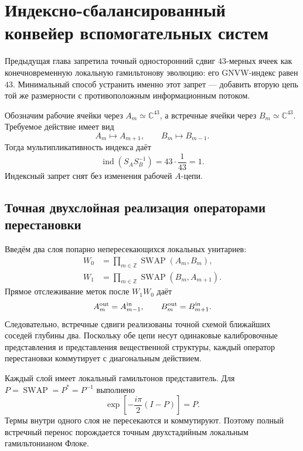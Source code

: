 \chapter{Индексно-сбалансированный конвейер вспомогательных систем}
\label{ch:v8-index-balanced-ancilla-conveyor-gate}

Предыдущая глава запретила точный односторонний сдвиг $43$-мерных ячеек
как конечновременную локальную гамильтонову эволюцию: его GNVW-индекс равен
$43$. Минимальный способ устранить именно этот запрет --- добавить вторую
цепь той же размерности с противоположным информационным потоком.

Обозначим рабочие ячейки через $A_m\simeq\mathbb C^{43}$, а встречные
ячейки через $B_m\simeq\mathbb C^{43}$. Требуемое действие имеет вид
\begin{equation}
 A_m\longmapsto A_{m+1},
 \qquad
 B_m\longmapsto B_{m-1}.
\end{equation}
Тогда мультипликативность индекса даёт
\begin{equation}
 \operatorname{ind}(S_A S_B^{-1})
 =43\cdot\frac1{43}=1.
\end{equation}
Индексный запрет снят без изменения рабочей $A$-цепи.

\section{Точная двухслойная реализация операторами перестановки}

Введём два слоя попарно непересекающихся локальных унитариев:
\begin{align}
 W_0&=\prod_{m\in\mathbb Z}\operatorname{SWAP}(A_m,B_m),\\
 W_1&=\prod_{m\in\mathbb Z}\operatorname{SWAP}(B_m,A_{m+1}).
\end{align}
Прямое отслеживание меток после $W_1W_0$ даёт
\begin{equation}
 A_m^{\rm out}=A_{m-1}^{\rm in},
 \qquad
 B_m^{\rm out}=B_{m+1}^{\rm in}.
\end{equation}
Следовательно, встречные сдвиги реализованы точной схемой ближайших соседей
глубины два. Поскольку обе цепи несут одинаковые калибровочные представления
и представления вещественной структуры, каждый оператор перестановки коммутирует с диагональным действием.

Каждый слой имеет локальный гамильтонов представитель. Для
$P=\operatorname{SWAP}=P^*=P^{-1}$ выполнено
\begin{equation}
 \exp\!\left[-\frac{i\pi}{2}(I-P)\right]=P.
\end{equation}
Термы внутри одного слоя не пересекаются и коммутируют. Поэтому полный
встречный перенос порождается точным двухстадийным локальным гамильтонианом Флоке.

